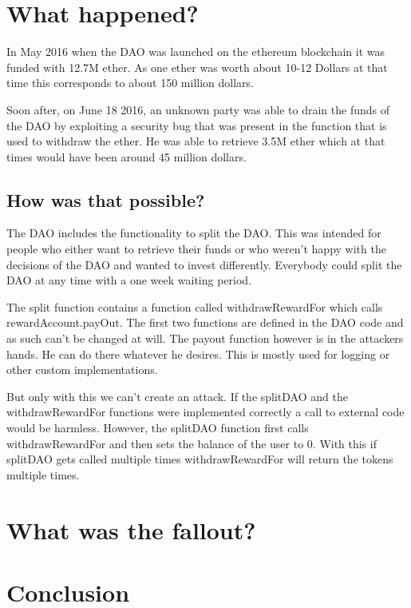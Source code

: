 \documentclass[a4paper, 11pt]{scrartcl}
\begin{document}
\section{What happened?}

In May 2016 when the DAO was launched on the ethereum blockchain it was funded with 12.7M ether. As one ether was worth about 10-12 Dollars at that time this corresponds to about 150 million dollars. 

Soon after, on June 18 2016, an unknown party was able to drain the funds of the DAO by exploiting a security bug that was present in the function that is used to withdraw the ether. He was able to retrieve 3.5M ether which at that times would have been around 45 million dollars. 

\subsection{How was that possible?}

The DAO includes the functionality to split the DAO. This was intended for people who either want to retrieve their funds or who weren't happy with the decisions of the DAO and wanted to invest differently. Everybody could split the DAO at any time with a one week waiting period.

The split function contains a function called withdrawRewardFor which calls rewardAccount.payOut. The first two functions are defined in the DAO code and as such can't be changed at will. The payout function however is in the attackers hands. He can do there whatever he desires. This is mostly used for logging or other custom implementations.

But only with this we can't create an attack. If the splitDAO and the withdrawRewardFor functions were implemented correctly a call to external code would be harmless. However, the splitDAO function first calls withdrawRewardFor and then sets the balance of the user to 0. With this if splitDAO gets called multiple times withdrawRewardFor will return the tokens multiple times. 

\section{What was the fallout?}

\section{Conclusion}

\nocite{*}
\clearpage
\printbibliography[heading=bibintoc]
\end{document}
